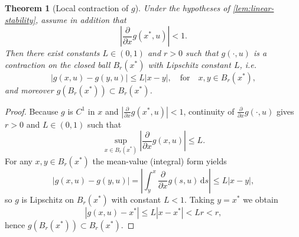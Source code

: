 \documentclass[10pt,a4paper]{amsart}
\newtheorem{theorem}{Theorem}
\begin{document}
\begin{theorem}[Local contraction of \(g\)]\label{thm:local-contraction}
Under the hypotheses of \cref{lem:linear-stability}, assume in addition that
\[
    \left|\frac{\partial}{\partial x} g(x^*,u)\right| < 1.
\]
Then there exist constants \(L\in(0,1)\) and \(r>0\) such that \(g(\cdot,u)\) is a contraction on the closed ball \(B_r(x^*)\) with Lipschitz constant \(L\), i.e.
\[
    |g(x,u) - g(y,u)| \le L |x-y|, \quad \text{for}\quad x,y\in B_r(x^*),
\]
and moreover \(g(B_r(x^*))\subset B_r(x^*)\).
\end{theorem}

\begin{proof}
Because \(g\) is \(C^1\) in \(x\) and \(|\frac{\partial}{\partial x} g(x^*,u)|<1\), continuity of \(\frac{\partial}{\partial x} g(\cdot,u)\) gives \(r>0\) and \(L\in(0,1)\) such that
\[
    \sup_{x\in B_r(x^*)} \left|\frac{\partial}{\partial x} g(x,u)\right| \le L.
\]
For any \(x,y\in B_r(x^*)\) the mean-value (integral) form yields
\[
    |g(x,u)-g(y,u)| = \left|\int_y^x \frac{\partial}{\partial x} g(s,u)\,\mathrm{d}s\right| \le L|x-y|,
\]
so \(g\) is Lipschitz on \(B_r(x^*)\) with constant \(L<1\). Taking \(y=x^*\) we obtain
\[
    |g(x,u)-x^*| \le L|x-x^*| < Lr < r,
\]
hence \(g(B_r(x^*))\subset B_r(x^*)\).
\end{proof}
\end{document}
